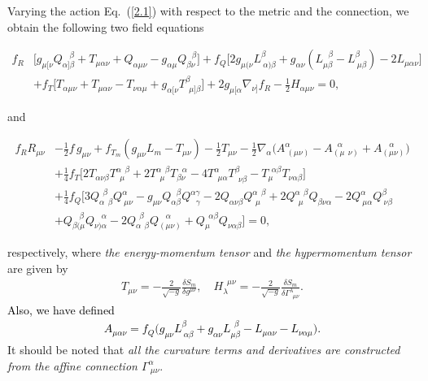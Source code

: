 \documentclass[aps,superscriptaddress, showpacs,preprintnumbers, superscriptaddress, nofootinbibt,twocolumn]{revtex4}
\newcommand{\te}[1]{\textcolor{black}{#1}}
\begin{document}
Varying the action Eq.~(\ref{2.1})  with respect to the metric and the connection,  we obtain the  following two field equations \cite{M1a}
\begin{widetext}
\begin{align}
f_R&\Big[g_{\mu[\nu}Q_{\alpha]\beta}^{~~~~\beta}+T_{\mu\alpha\nu}+Q_{\alpha\mu\nu}-g_{\alpha\mu}Q_{\beta\nu}^{~~~\beta}\Big]+f_Q\Big[2g_{\mu(\nu}L^\beta_{~\alpha)\beta}+g_{\alpha\nu}(L_{\mu\beta}^{~~~\beta}-L^\beta_{~\mu\beta})-2L_{\mu\alpha\nu}\Big]\nonumber\\
&+f_T\Big[T_{\alpha\mu\nu}+T_{\mu\alpha\nu}-T_{\nu\alpha\mu}+g_{\alpha[\nu}T^\beta_{~~\mu]\beta}\Big]+2g_{\mu[\alpha}\nabla_{\nu]}f_R-\frac12H_{\alpha\mu\nu}=0,
	\end{align}
\end{widetext}
and
\begin{widetext}
\begin{align}
f_R R_{\mu\nu}&-\frac12f\,g_{\mu\nu}+f_{T_m}(g_{\mu\nu}L_m-T_{\mu\nu})-\frac12T_{\mu\nu}-\frac12\nabla_\alpha\Big(A^\alpha_{~(\mu\nu)}-A_{(\mu~~\nu)}^{~~\,\alpha}+A_{(\mu\nu)}^{~~~~\alpha}\Big)\nonumber\\
&+\frac14f_T\Big[2T_{\alpha\nu\beta}T^{\alpha~~\beta}_{~~\mu}+2T^{\alpha~~\beta}_{~~\mu}T_{\beta\nu}^{~~~\alpha}-4T^\alpha_{~~\mu\alpha}T^\beta_{~~\nu\beta}-T_\mu^{~~\alpha\beta}T_{\nu\alpha\beta}\Big]\nonumber\\
&+\frac14f_Q\Big[3Q_{\alpha~~\beta}^{~~\beta}Q^\alpha_{~\mu\nu}-g_{\mu\nu}Q_{\alpha\beta}^{~~~\beta}Q^{\alpha\gamma}_{~~~\gamma}-2Q_{\alpha\nu\beta}Q^{\alpha~~\beta}_{~\,\mu}+2Q^{\alpha~~\beta}_{~~\mu}Q_{\beta\nu\alpha}-2Q^\alpha_{~\mu\alpha}Q^\beta_{~\nu\beta}\nonumber\\
&+Q_{\beta(\mu}^{~~~~\beta}Q_{\nu)\alpha}^{~~~~\alpha}-2Q_{\alpha~~\beta}^{~~\beta}Q_{(\mu\nu)}^{~~~~\alpha}+Q_\mu^{~~\alpha\beta}Q_{\nu\alpha\beta}\Big]=0,
\end{align}
\end{widetext}
respectively, where  {\it the energy-momentum tensor} and {\it the hypermomentum tensor} are given by
\begin{eqnarray}
{ T}_{\mu\nu}=-\frac{2}{\sqrt{-g}}\frac{\delta S_{m}}{\delta g^{\mu\nu}}, \quad H_{\lambda}^{\, \, \, \mu\nu}=-\frac{2}{\sqrt{-g}}\frac{\delta S_{m}}{\delta \Gamma^{\lambda}_{\,\,\, \mu\nu}}.
\end{eqnarray}
\te{Also, we have defined
\begin{align}
A_{\mu\alpha\nu}=f_Q\big(g_{\mu\nu}L^\beta_{~\alpha\beta}+g_{\alpha\nu}L_{\mu\beta}^{~~\beta}-L_{\mu\alpha\nu}-L_{\nu\alpha\mu}\big).
\end{align}}
It should be noted that {\it all the curvature terms and derivatives are constructed from the affine connection $\Gamma^\alpha_{~\mu\nu}$}.
\end{document}
